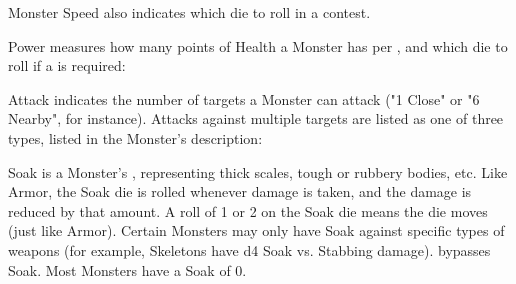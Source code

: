 {Monster Speed also indicates which die to roll in a \RB{\DEX} contest.



Power measures how many points of Health a Monster has per \HD, and which die to roll if a \VIG \RB is required:



Attack indicates the number of targets a Monster can attack ("1 Close" or "6 Nearby", for instance). Attacks against multiple targets are listed as one of three types, listed in the Monster's description:




Soak is a Monster's , representing thick scales, tough or rubbery bodies, etc.  Like Armor, the Soak die is rolled whenever  damage is taken, and the damage is reduced by that amount. A roll of 1 or 2 on the Soak die means the die moves \DCDOWN (just like Armor). Certain Monsters may only have Soak against specific types of weapons (for example, Skeletons have d4 Soak vs. Stabbing damage).   bypasses Soak. Most Monsters have a Soak of 0.


}
